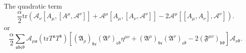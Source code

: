 The quadratic term
\[
\frac{\alpha}{2} \mathrm{tr} \left( 
\mathscr{A}_\nu [A_\mu,[A^\mu,\mathscr{A}^\nu]]
+ \mathscr{A}^\mu [A_\mu,[A_\nu,\mathscr{A}^\nu]]
- 2 \mathscr{A}^\mu [[A_\mu,A_\nu],\mathscr{A}^\nu]\right) 
.\] 
or
\[
	\frac{\alpha}{2}\sum_{\mathfrak{a}\mathfrak{b}\mathfrak{c}\mathfrak{d}}
	\mathscr{A}_{\mu \mathfrak{a}}
	(\mathrm{tr}T^{\mathfrak{a}}T^{\mathfrak{b}})
	\left[(\mathfrak{A}_\rho)_{\mathfrak{b} \mathfrak{c}}
	(\mathfrak{A}^\rho)_{\mathfrak{c}\mathfrak{d}} \eta^{\mu\nu} + 
(\mathfrak{A}^\mu)_{\mathfrak{b} \mathfrak{c}}
	(\mathfrak{A}^\nu)_{\mathfrak{c}\mathfrak{d}} 
- 2 (\mathfrak{F}^{\mu\nu})_{\mathfrak{b}\mathfrak{d}}\right]
	\mathscr{A}_{\nu \mathfrak{d}}
.\] 
